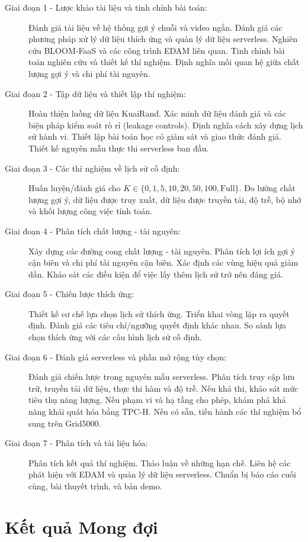 \documentclass[12pt,a4paper]{article}
\begin{document}
\begin{description}
    \item[Giai đoạn 1 - Lược khảo tài liệu và tinh chỉnh bài toán:] Đánh giá tài liệu về hệ thống gợi ý chuỗi và video ngắn. Đánh giá các phương pháp xử lý dữ liệu thích ứng và quản lý dữ liệu serverless. Nghiên cứu BLOOM-FaaS và các công trình EDAM liên quan. Tinh chỉnh bài toán nghiên cứu và thiết kế thí nghiệm. Định nghĩa mối quan hệ giữa chất lượng gợi ý và chi phí tài nguyên.
    \item[Giai đoạn 2 - Tập dữ liệu và thiết lập thí nghiệm:] Hoàn thiện luồng dữ liệu KuaiRand. Xác minh dữ liệu đánh giá và các biện pháp kiểm soát rò rỉ (leakage controls). Định nghĩa cách xây dựng lịch sử hành vi. Thiết lập bài toán học có giám sát và giao thức đánh giá. Thiết kế nguyên mẫu thực thi serverless ban đầu.
    \item[Giai đoạn 3 - Các thí nghiệm về lịch sử cố định:] Huấn luyện/đánh giá cho $K \in \{0, 1, 5, 10, 20, 50, 100, \text{Full}\}$. Đo lường chất lượng gợi ý, dữ liệu được truy xuất, dữ liệu được truyền tải, độ trễ, bộ nhớ và khối lượng công việc tính toán.
    \item[Giai đoạn 4 - Phân tích chất lượng - tài nguyên:] Xây dựng các đường cong chất lượng - tài nguyên. Phân tích lợi ích gợi ý cận biên và chi phí tài nguyên cận biên. Xác định các vùng hiệu quả giảm dần. Khảo sát các điều kiện để việc lấy thêm lịch sử trở nên đáng giá.
    \item[Giai đoạn 5 - Chiến lược thích ứng:] Thiết kế cơ chế lựa chọn lịch sử thích ứng. Triển khai vòng lặp ra quyết định. Đánh giá các tiêu chí/ngưỡng quyết định khác nhau. So sánh lựa chọn thích ứng với các cấu hình lịch sử cố định.
    \item[Giai đoạn 6 - Đánh giá serverless và phần mở rộng tùy chọn:] Đánh giá chiến lược trong nguyên mẫu serverless. Phân tích truy cập lưu trữ, truyền tải dữ liệu, thực thi hàm và độ trễ. Nếu khả thi, khảo sát mức tiêu thụ năng lượng. Nếu phạm vi và hạ tầng cho phép, khám phá khả năng khái quát hóa bằng TPC-H. Nếu có sẵn, tiến hành các thí nghiệm bổ sung trên Grid5000.
    \item[Giai đoạn 7 - Phân tích và tài liệu hóa:] Phân tích kết quả thí nghiệm. Thảo luận về những hạn chế. Liên hệ các phát hiện với EDAM và quản lý dữ liệu serverless. Chuẩn bị báo cáo cuối cùng, bài thuyết trình, và bản demo.
\end{description}

\section{Kết quả Mong đợi}
\end{document}
